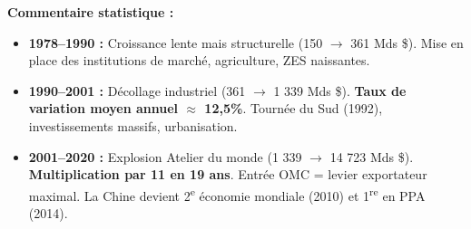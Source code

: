 \documentclass[11pt]{article}
\begin{document}
\begin{exoresolu}
\textbf{Commentaire statistique :}
\begin{itemize}
    \item \textbf{1978--1990 :} Croissance lente mais structurelle (150 $\rightarrow$ 361 Mds \$). Mise en place des institutions de marché, agriculture, ZES naissantes.
    \item \textbf{1990--2001 :} Décollage industriel (361 $\rightarrow$ 1 339 Mds \$). \textbf{Taux de variation moyen annuel $\approx$ 12,5\%}. Tournée du Sud (1992), investissements massifs, urbanisation.
    \item \textbf{2001--2020 :} Explosion \og Atelier du monde \fg (1 339 $\rightarrow$ 14 723 Mds \$). \textbf{Multiplication par 11 en 19 ans}. Entrée OMC = levier exportateur maximal. La Chine devient 2\textsuperscript{e} économie mondiale (2010) et 1\textsuperscript{re} en PPA (2014).
\end{itemize}


\end{exoresolu}
\end{document}
